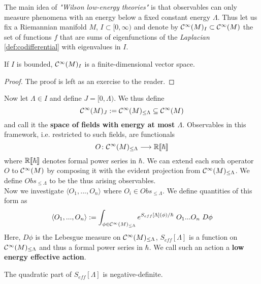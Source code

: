 The main idea of \emph{"Wilson low-energy theories"} is that observables can only measure phenomena with an energy below a fixed constant energy $\Lambda$. Thus let us fix a Riemannian manifold $M$, $I \subset [0,\infty)$ and denote by $\mathcal{C}^{\infty}(M)_I \subset \mathcal{C}^{\infty}(M)$ the set of functions $f$ that are sums of eigenfunctions of the \emph{Laplacian} \ref{def:codifferential} with eigenvalues in $I$.

\begin{lem}
  If $I$ is bounded, $\mathcal{C}^{\infty}(M)_I$ is a finite-dimensional vector space.
\begin{proof}
  The proof is left as an exercise to the reader.
\end{proof}
\end{lem}

Now let $\Lambda \in I$ and define $J = [0,\Lambda)$. We thus define
\begin{equation} \mathcal{C}^{\infty}(M)_J := \mathcal{C}^{\infty}(M)_{\leq \Lambda} \subseteq \mathcal{C}^{\infty}(M)\end{equation}
and call it the \textbf{space of fields with energy at most $\Lambda$}. Observables in this framework, i.e. restricted to such fields, are functionals
\begin{equation} O \colon \mathcal{C}^{\infty}(M)_{\leq \Lambda} \longrightarrow \mathbb{R}\llbracket \hbar \rrbracket\end{equation}
where $\mathbb{R}\llbracket \hbar \rrbracket$ denotes formal power series in $\hbar$. We can extend each such operator $O$ to $\mathcal{C}^{\infty}(M)$ by composing it with the evident projection from $\mathcal{C}^{\infty}(M)_{\leq \Lambda}$. We define $Obs_{\leq \Lambda}$ to be the thus arising observables.\\

Now we investigate $\langle O_1, ..., O_n \rangle$ where $O_i \in Obs_{\leq \Lambda}$. We define quantities of this form as
\begin{equation} \langle O_1, ..., O_n \rangle := \int_{\phi \in \Ci(M)_{\leq \Lambda}} e^{S_{eff}[\Lambda](\phi) / \hbar} \ O_1 ... O_n \ D\phi\end{equation}
Here, $D\phi$ is the Lebesgue measure on $\mathcal{C}^{\infty}(M)_{\leq \Lambda}$, $S_{eff}[\Lambda]$ is a function on $\mathcal{C}^{\infty}(M)_{\leq \Lambda}$ and thus a formal power series in $\hbar$. We call such an action a \textbf{low energy effective action}.

\begin{rem}
  The quadratic part of $S_{eff}[\Lambda]$ is negative-definite.
\end{rem}

